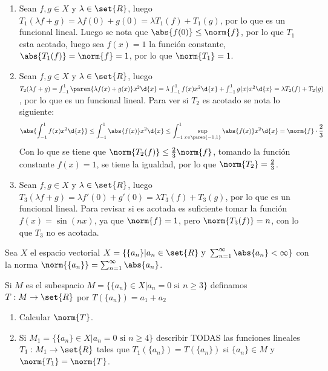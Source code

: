 \begin{sol}
    \begin{enumerate}
        \item Sean \(f,g\in X\) y \(\lambda\in\set{R}\), luego \(T_1(\lambda f+g)=\lambda f(0)+g(0)=\lambda T_1(f)+T_1(g)\), por lo que es un funcional lineal. Luego se nota que \(\abs{f(0)}\leq\norm{f}\), por lo que \(T_1\) esta acotado, luego sea \(f(x)=1\) la función constante, \(\abs{T_1(f)}=\norm{f}=1\), por lo que \(\norm{T_1}=1\).
        \item Sean \(f,g\in X\) y \(\lambda\in\set{R}\), luego \(T_2(\lambda f+g)=\int_{-1}^1\paren{\lambda f(x)+g(x)}x^2\d{x}=\lambda\int_{-1}^1f(x)x^2\d{x}+\int_{-1}^1g(x)x^2\d{x}=\lambda T_2(f)+T_2(g)\), por lo que es un funcional lineal. Para ver si \(T_2\) es acotado se nota lo siguiente:
        \[\abs{\int_{-1}^1f(x)x^2\d{x}}\leq\int_{-1}^1\abs{f(x)}x^2\d{x}\leq\int_{-1}^1\sup_{x\in\paren{-1,1}}\abs{f(x)}x^2\d{x}=\norm{f}\cdot\frac23\]
        Con lo que se tiene que \(\norm{T_2(f)}\leq\frac23\norm{f}\), tomando la función constante \(f(x)=1\), se tiene la igualdad, por lo que \(\norm{T_2}=\frac23\).
        \item Sean \(f,g\in X\) y \(\lambda\in\set{R}\), luego \(T_3(\lambda f+g)=\lambda f'(0)+g'(0)=\lambda T_3(f)+T_3(g)\), por lo que es un funcional lineal. Para revisar si es acotada es suficiente tomar la función \(f(x)=\sin(nx)\), ya que \(\norm{f}=1\), pero \(\norm{T_3(f)}=n\), con lo que \(T_3\) no es acotada.
    \end{enumerate}
\end{sol}

\begin{prob}
    Sea \(X\) el espacio vectorial \(X=\{\{a_n\}|a_n\in\set{R}\text{ y }\sum_{n=1}^\infty\abs{a_n}<\infty\}\) con la norma \(\norm{\{a_n\}}=\sum_{n=1}^\infty\abs{a_n}\).

    Si \(M\) es el subespacio \(M=\{\{a_n\}\in X|a_n=0\text{ si }n\geq3\}\) definamos \(T:M\rightarrow\set{R}\) por \(T(\{a_n\})=a_1+a_2\)
    \begin{enumerate}
        \item Calcular \(\norm{T}\).
        \item Si \(M_1=\{\{a_n\}\in X|a_n=0\text{ si }n\geq4\}\) describir TODAS las funciones lineales \(T_1:M_1\rightarrow\set{R}\) tales que \(T_1(\{a_n\})=T(\{a_n\})\) si \(\{a_n\}\in M\) y \(\norm{T_1}=\norm{T}\).
    \end{enumerate}
\end{prob}

